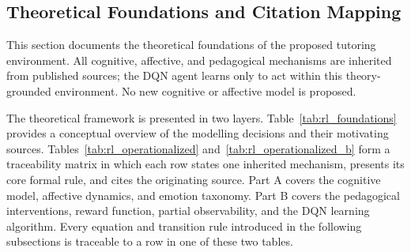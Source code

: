 \subsection{Theoretical Foundations and Citation Mapping}\label{sec:method_rl_intro}

This section documents the theoretical foundations of the proposed tutoring environment. All cognitive, affective, and pedagogical mechanisms are inherited from published sources; the \ac{DQN} agent learns only to act within this theory-grounded environment. No new cognitive or affective model is proposed.

The theoretical framework is presented in two layers. Table~\ref{tab:rl_foundations} provides a conceptual overview of the modelling decisions and their motivating sources. Tables~\ref{tab:rl_operationalized} and~\ref{tab:rl_operationalized_b} form a traceability matrix in which each row states one inherited mechanism, presents its core formal rule, and cites the originating source. Part A covers the cognitive model, affective dynamics, and emotion taxonomy. Part B covers the pedagogical interventions, reward function, partial observability, and the \ac{DQN} learning algorithm. Every equation and transition rule introduced in the following subsections is traceable to a row in one of these two tables.

